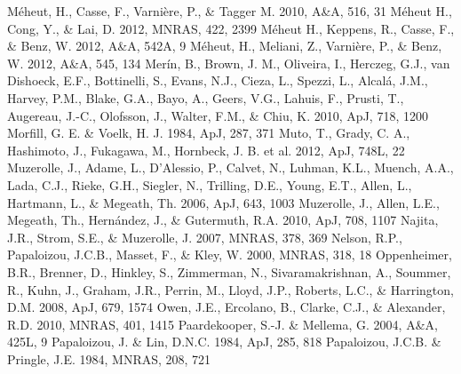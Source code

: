 \documentclass[apj]{emulateapj}
\begin{document}
\begin{thebibliography}{}
 M\'eheut, H., Casse, F., Varni\`ere, P., \& Tagger M. 2010, A\&A, 516, 31
 M\'eheut H., Cong, Y., \& Lai, D. 2012, MNRAS, 422, 2399
 M\'eheut H., Keppens,  R., Casse, F., \& Benz, W. 2012, A\&A, 542A, 9
 M\'eheut, H., Meliani, Z., Varni\`ere, P., \& Benz, W. 2012, A\&A, 545, 134
 Mer\'in, B., Brown, J. M., Oliveira, I., Herczeg, G.J., van Dishoeck, E.F., Bottinelli, S., Evans, N.J., Cieza, L., Spezzi, L., Alcal\'a, J.M., Harvey, P.M., Blake, G.A., Bayo, A., Geers, V.G., Lahuis, F., Prusti, T., Augereau, J.-C., Olofsson, J., Walter, F.M., \& Chiu, K. 2010, ApJ, 718, 1200
 Morfill, G. E. \& Voelk, H. J. 1984, ApJ, 287, 371
 Muto, T., Grady, C. A., Hashimoto, J., Fukagawa, M., Hornbeck, J. B. et al. 2012, ApJ, 748L, 22
 Muzerolle, J., Adame, L., D'Alessio, P., Calvet, N., Luhman, K.L., Muench, A.A., Lada, C.J., Rieke, G.H., Siegler, N., Trilling, D.E., Young, E.T., Allen, L., Hartmann, L., \& Megeath, Th. 2006, ApJ, 643, 1003
 Muzerolle, J., Allen, L.E., Megeath, Th., Hern\'andez, J., \& Gutermuth, R.A. 2010, ApJ, 708, 1107
 Najita, J.R., Strom, S.E., \& Muzerolle, J. 2007, MNRAS, 378, 369
 Nelson, R.P., Papaloizou, J.C.B., Masset, F., \& Kley, W. 2000, MNRAS, 318, 18
 Oppenheimer, B.R., Brenner, D., Hinkley, S., Zimmerman, N., Sivaramakrishnan, A., Soummer, R., Kuhn, J., Graham, J.R., Perrin, M., Lloyd, J.P., Roberts, L.C., \& Harrington, D.M. 2008, ApJ, 679, 1574
 Owen, J.E., Ercolano, B., Clarke, C.J., \& Alexander, R.D. 2010, MNRAS, 401, 1415
 Paardekooper, S.-J. \& Mellema, G.	2004, A\&A, 425L, 9
 Papaloizou, J. \& Lin, D.N.C. 1984, ApJ, 285, 818
 Papaloizou, J.C.B. \& Pringle, J.E. 1984, MNRAS, 208, 721

\end{thebibliography}
\end{document}
